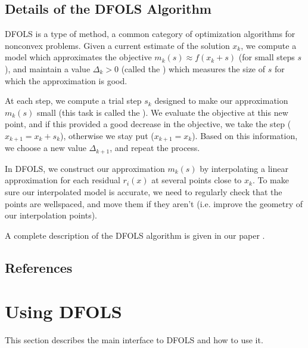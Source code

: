 \documentclass[letterpaper,10pt,english]{sphinxmanual}
\begin{document}
\section{Details of the DFO\sphinxhyphen{}LS Algorithm}
\label{\detokenize{info:details-of-the-dfo-ls-algorithm}}
DFO\sphinxhyphen{}LS is a type of  method, a common category of optimization algorithms for nonconvex problems. Given a current estimate of the solution \(x_k\), we compute a model which approximates the objective \(m_k(s)\approx f(x_k+s)\) (for small steps \(s\)), and maintain a value \(\Delta_k>0\) (called the ) which measures the size of \(s\) for which the approximation is good.

At each step, we compute a trial step \(s_k\) designed to make our approximation \(m_k(s)\) small (this task is called the ). We evaluate the objective at this new point, and if this provided a good decrease in the objective, we take the step (\(x_{k+1}=x_k+s_k\)), otherwise we stay put (\(x_{k+1}=x_k\)). Based on this information, we choose a new value \(\Delta_{k+1}\), and repeat the process.

In DFO\sphinxhyphen{}LS, we construct our approximation \(m_k(s)\) by interpolating a linear approximation for each residual \(r_i(x)\) at several points close to \(x_k\). To make sure our interpolated model is accurate, we need to regularly check that the points are well\sphinxhyphen{}spaced, and move them if they aren’t (i.e. improve the geometry of our interpolation points).

A complete description of the DFO\sphinxhyphen{}LS algorithm is given in our paper .


\section{References}
\label{\detokenize{info:references}}

\chapter{Using DFO\sphinxhyphen{}LS}
\label{\detokenize{userguide:using-dfo-ls}}\label{\detokenize{userguide::doc}}
This section describes the main interface to DFO\sphinxhyphen{}LS and how to use it.
\end{document}
